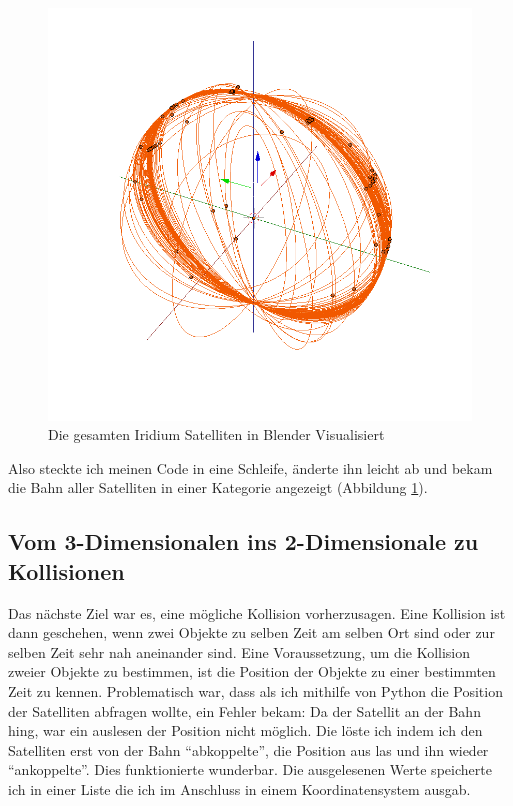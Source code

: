 \begin{figure}[h]
  \centering
  \includegraphics[height=0.5\textwidth]{figs/iridium_sat_all_w}
  \caption{Die gesamten Iridium Satelliten in Blender Visualisiert}
  \label{fig:iridium_sat_all}
\end{figure}

Also steckte ich
meinen Code in eine Schleife, änderte ihn leicht ab und bekam die Bahn aller Satelliten in einer
Kategorie angezeigt (Abbildung \ref{fig:iridium_sat_all}).
\par

\subsection{Vom 3-Dimensionalen ins 2-Dimensionale zu Kollisionen}

Das nächste Ziel war es, eine mögliche Kollision vorherzusagen. Eine Kollision ist dann geschehen,
wenn zwei Objekte zu selben Zeit am selben Ort sind oder zur selben Zeit sehr nah aneinander sind.
Eine Voraussetzung, um die Kollision zweier Objekte zu bestimmen, ist die Position der Objekte zu
einer bestimmten Zeit zu kennen. Problematisch war, dass als ich mithilfe von Python die Position
der Satelliten abfragen wollte, ein Fehler bekam: Da der Satellit an der Bahn hing, war ein
auslesen der Position nicht möglich. Die löste ich indem ich den Satelliten erst von der Bahn
``abkoppelte'', die Position aus las und ihn wieder ``ankoppelte''. Dies funktionierte wunderbar.
Die ausgelesenen Werte speicherte ich in einer Liste die ich im Anschluss in einem
Koordinatensystem ausgab.


